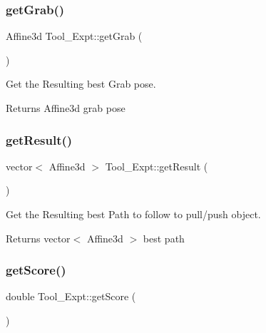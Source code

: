 \subsubsection{\texorpdfstring{get\+Grab()}{getGrab()}}
{\footnotesize\ttfamily Affine3d Tool\+\_\+\+Expt\+::get\+Grab (\begin{DoxyParamCaption}{ }\end{DoxyParamCaption})\hspace{0.3cm}{\ttfamily [inline]}}



Get the Resulting best Grab pose. 

\begin{DoxyReturn}{Returns}
Affine3d grab pose 
\end{DoxyReturn}
\mbox{\label{classTool__Expt_a0cace0822f22745b9aa5b7abaa2cec2b}} 
\subsubsection{\texorpdfstring{get\+Result()}{getResult()}}
{\footnotesize\ttfamily vector$<$ Affine3d $>$ Tool\+\_\+\+Expt\+::get\+Result (\begin{DoxyParamCaption}{ }\end{DoxyParamCaption})\hspace{0.3cm}{\ttfamily [inline]}}



Get the Resulting best Path to follow to pull/push object. 

\begin{DoxyReturn}{Returns}
vector$<$ Affine3d $>$ best path 
\end{DoxyReturn}
\mbox{\label{classTool__Expt_a1fb8b0a8c2fe25b5e909dcde87b34dd3}} 
\subsubsection{\texorpdfstring{get\+Score()}{getScore()}}
{\footnotesize\ttfamily double Tool\+\_\+\+Expt\+::get\+Score (\begin{DoxyParamCaption}{ }\end{DoxyParamCaption})\hspace{0.3cm}{\ttfamily [inline]}}




